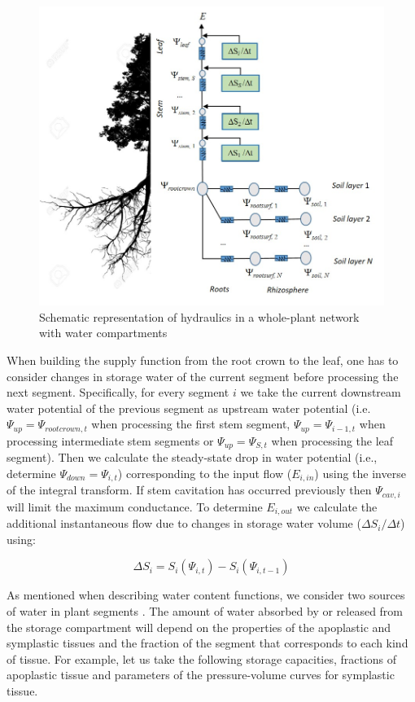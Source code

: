 \documentclass[]{book}
\begin{document}
\begin{figure}

{\centering \includegraphics[width=0.8\linewidth]{hydraulics_full} 

}

\caption{Schematic representation of hydraulics in a whole-plant network with water compartments}\label{fig:unnamed-chunk-42}
\end{figure}

When building the supply function from the root crown to the leaf, one
has to consider changes in storage water of the current segment before
processing the next segment. Specifically, for every segment \(i\) we
take the current downstream water potential of the previous segment as
upstream water potential (i.e. \(\Psi_{up} = \Psi_{rootcrown, t}\) when
processing the first stem segment, \(\Psi_{up} = \Psi_{i-1, t}\) when
processing intermediate stem segments or \(\Psi_{up} = \Psi_{S, t}\)
when processing the leaf segment). Then we calculate the steady-state
drop in water potential (i.e., determine \(\Psi_{down} = \Psi_{i, t}\))
corresponding to the input flow (\(E_{i,in}\)) using the inverse of the
integral transform. If stem cavitation has occurred previously then
\(\Psi_{cav,i}\) will limit the maximum conductance. To determine
\(E_{i,out}\) we calculate the additional instantaneous flow due to
changes in storage water volume (\(\Delta S_{i}/\Delta t\)) using:

\begin{equation}
\Delta S_{i} = S_i(\Psi_{i, t}) - S_i(\Psi_{i, t-1})
\end{equation}

As mentioned when describing water content functions, we consider two
sources of water in plant segments \citep{Tyree1990}. The amount of
water absorbed by or released from the storage compartment will depend
on the properties of the apoplastic and symplastic tissues and the
fraction of the segment that corresponds to each kind of tissue. For
example, let us take the following storage capacities, fractions of
apoplastic tissue and parameters of the pressure-volume curves for
symplastic tissue.
\end{document}
